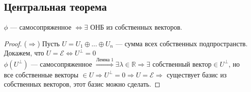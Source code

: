 \subsection{Центральная теорема}
\begin{theorem}
$\phi$ --- самосопряженное $\Leftrightarrow \exists
$ ОНБ из собственных векторов.
\end{theorem}
\begin{proof}
	($\Rightarrow$) Пусть $U=U_1 \oplus ... \oplus U_n$ --- сумма всех собственных подпространств. Докажем, что $U= \mathcal{E} \Leftrightarrow U^\perp = 0$ \\
	$\phi(U^\perp)$ --- самосопряженное $	\overset{\text{Лемма 1}}{\Rightarrow}  \exists \lambda \in \mathbb{R} \Rightarrow \exists \text{~собственный вектор} \in U^\perp$, но все собственные векторы $\in U \Rightarrow U^\perp = 0 \Rightarrow U = \mathcal{E} \Rightarrow$ существует базис из собственных векторов, этот базис можно сделать.
\end{proof}